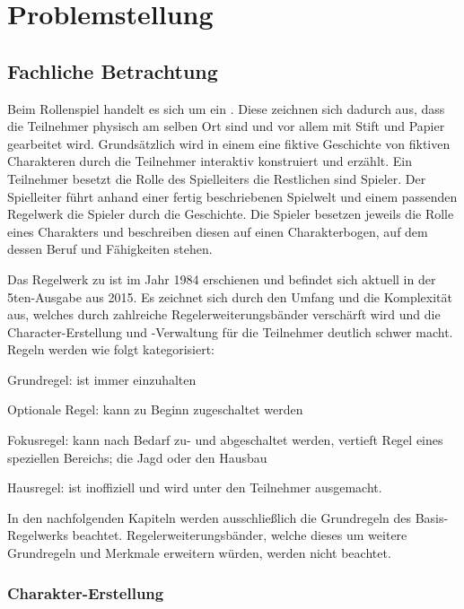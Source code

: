 \section{Problemstellung}
\label{sec:problemstellung}


\subsection{Fachliche Betrachtung}
\label{subsec:fachliche-betrachtung}

Beim Rollenspiel  handelt es sich um ein \sog {}.
Diese zeichnen sich \insb dadurch aus, dass die Teilnehmer physisch am selben Ort sind und vor allem mit Stift und Papier gearbeitet wird.
Grundsätzlich wird in einem  eine fiktive Geschichte von fiktiven Charakteren durch die Teilnehmer interaktiv konstruiert und erzählt.
Ein Teilnehmer besetzt die Rolle des \sog Spielleiters\; die Restlichen sind \sog Spieler.
Der Spielleiter führt anhand einer fertig beschriebenen Spielwelt und einem passenden Regelwerk die Spieler durch die Geschichte.
Die Spieler besetzen jeweils die Rolle eines Charakters und beschreiben diesen auf einen \sog Charakterbogen, auf dem \uA dessen Beruf und Fähigkeiten stehen.

Das  Regelwerk zu  ist im Jahr 1984 erschienen und befindet sich aktuell in der 5ten-Ausgabe aus 2015.
Es zeichnet sich \insb durch den Umfang und die Komplexität aus, welches durch zahlreiche Regelerweiterungsbänder verschärft wird und \uA die Character-Erstellung und -Verwaltung für die Teilnehmer deutlich schwer macht.
Regeln werden wie folgt kategorisiert:
\begin{inparaenum}
    [a)]
    \item Grundregel: ist immer einzuhalten
    \item Optionale Regel: kann zu Beginn zugeschaltet werden
    \item Fokusregel: kann nach Bedarf zu- und abgeschaltet werden, vertieft Regel eines speziellen Bereichs; \zB die Jagd oder den Hausbau
    \item Hausregel: ist inoffiziell und wird unter den Teilnehmer ausgemacht.
\end{inparaenum}

In den nachfolgenden Kapiteln werden ausschließlich die Grundregeln des Basis-Regelwerks beachtet.
Regelerweiterungsbänder, welche dieses um weitere Grundregeln und Merkmale erweitern würden, werden nicht beachtet.


\subsubsection{Charakter-Erstellung}
\label{subsubsec:charakter-erstellung}

